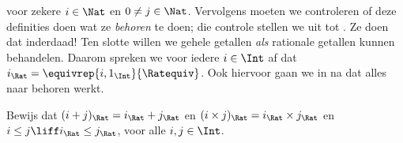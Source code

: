\documentclass[../../../include/open-logic-section]{subfiles}
\begin{document}
voor zekere $i \in \Nat$ en $0 \neq j \in \Nat$.
Vervolgens moeten we controleren of deze definities doen wat ze
\emph{behoren} te doen; die controle stellen we uit tot .
Ze doen dat inderdaad!{} Ten slotte willen we gehele getallen \emph{als}
rationale getallen kunnen behandelen. Daarom spreken we voor iedere
$i \in \Int$ af dat $i_\Rat = \equivrep{i, 1_\Int}{\Ratequiv}$. Ook hiervoor
gaan we in  na dat alles naar behoren werkt.
\begin{prob}
Bewijs dat $(i + j)_\Rat = i_\Rat+ j_\Rat$ en $(i \times j)_\Rat =
i_\Rat \times j_\Rat$ en $i \leq j \liff i_\Rat \leq j_\Rat$, voor alle
$i, j \in \Int$.
\end{prob}
\end{document}
